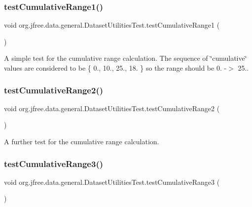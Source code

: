 \subsubsection{\texorpdfstring{test\+Cumulative\+Range1()}{testCumulativeRange1()}}
{\footnotesize\ttfamily void org.\+jfree.\+data.\+general.\+Dataset\+Utilities\+Test.\+test\+Cumulative\+Range1 (\begin{DoxyParamCaption}{ }\end{DoxyParamCaption})}

A simple test for the cumulative range calculation. The sequence of \char`\"{}cumulative\char`\"{} values are considered to be \{ 0., 10., 25., 18. \} so the range should be 0. -\/$>$ 25.. \mbox{\label{classorg_1_1jfree_1_1data_1_1general_1_1_dataset_utilities_test_aced6a4a3e112d5bc03f6519090692a53}} 
\subsubsection{\texorpdfstring{test\+Cumulative\+Range2()}{testCumulativeRange2()}}
{\footnotesize\ttfamily void org.\+jfree.\+data.\+general.\+Dataset\+Utilities\+Test.\+test\+Cumulative\+Range2 (\begin{DoxyParamCaption}{ }\end{DoxyParamCaption})}

A further test for the cumulative range calculation. \mbox{\label{classorg_1_1jfree_1_1data_1_1general_1_1_dataset_utilities_test_aa843c3f4b279437048453cd02d295daf}} 
\subsubsection{\texorpdfstring{test\+Cumulative\+Range3()}{testCumulativeRange3()}}
{\footnotesize\ttfamily void org.\+jfree.\+data.\+general.\+Dataset\+Utilities\+Test.\+test\+Cumulative\+Range3 (\begin{DoxyParamCaption}{ }\end{DoxyParamCaption})}

